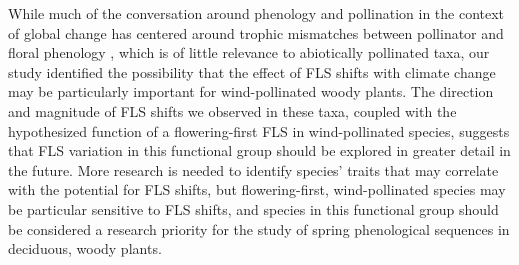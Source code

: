 \documentclass[11pt]{article}
\begin{document}
\noindent While much of the conversation around phenology and pollination in the context of global change has centered around trophic mismatches between pollinator and floral phenology \citep{Memmott2007}, which is of little relevance to abiotically pollinated taxa, our study identified the possibility that the effect of FLS shifts with climate change may be particularly important for wind-pollinated woody plants. The direction and magnitude of FLS shifts we observed in these taxa, coupled with the hypothesized function of a flowering-first FLS in wind-pollinated species, suggests that FLS variation in this functional group should be explored in greater detail in the future. More research is needed to identify species' traits that may correlate with the potential for FLS shifts, but flowering-first, wind-pollinated species may be particular sensitive to FLS shifts, and species in this functional group should be considered a research priority for the study of spring phenological sequences in deciduous, woody plants. 


 

\end{document}
